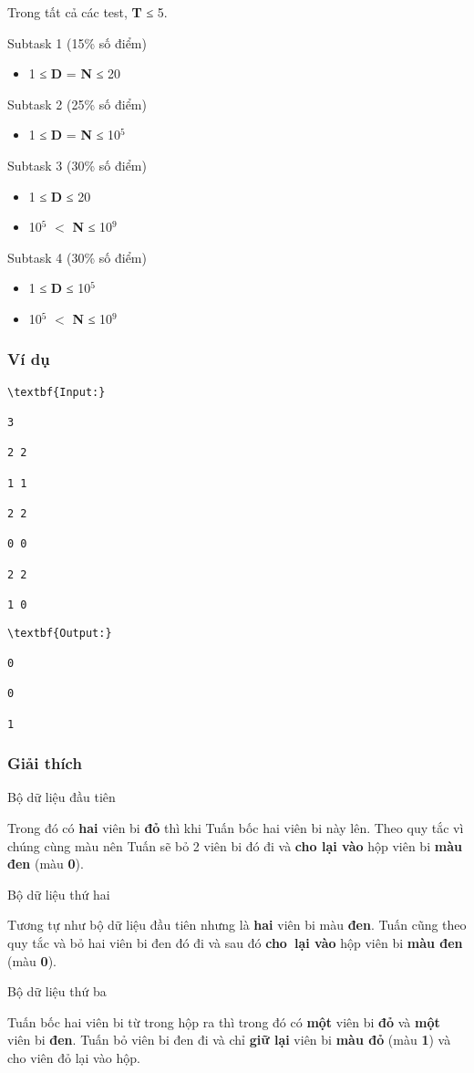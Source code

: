 Trong tất cả các test, \textbf{T} ≤ 5.

Subtask 1 (15\% số điểm)
\begin{itemize}
	\item 1 ≤ \textbf{D} = \textbf{N} ≤ 20
\end{itemize}

Subtask 2 (25\% số điểm)
\begin{itemize}
	\item 1 ≤ \textbf{D} = \textbf{N} ≤ 10$^5$
\end{itemize}

Subtask 3 (30\% số điểm)
\begin{itemize}
	\item 1 ≤ \textbf{D} ≤ 20
	\item 10$^5$ $<$ \textbf{N} ≤ 10$^9$
\end{itemize}

Subtask 4 (30\% số điểm)
\begin{itemize}
	\item 1 ≤ \textbf{D} ≤ 10$^5$
	\item 10$^5$ $<$ \textbf{N} ≤ 10$^9$
\end{itemize}

\subsubsection{Ví dụ}
\begin{verbatim}
\textbf{Input:}

3

2 2

1 1

2 2

0 0

2 2

1 0\end{verbatim}
\begin{verbatim}
\textbf{Output:}

0

0

1\end{verbatim}

\subsubsection{Giải thích}

Bộ dữ liệu đầu tiên

Trong đó có \textbf{hai} viên bi \textbf{đỏ} thì khi Tuấn bốc hai viên bi này lên. Theo quy tắc vì chúng cùng màu nên Tuấn sẽ bỏ 2 viên bi đó đi và \textbf{cho lại vào} hộp viên bi \textbf{màu đen} (màu \textbf{0}).

Bộ dữ liệu thứ hai

Tương tự như bộ dữ liệu đầu tiên nhưng là \textbf{hai} viên bi màu \textbf{đen}. Tuấn cũng theo quy tắc và bỏ hai viên bi đen đó đi và sau đó \textbf{cho lại vào} hộp viên bi \textbf{màu đen} (màu \textbf{0}).

Bộ dữ liệu thứ ba

Tuấn bốc hai viên bi từ trong hộp ra thì trong đó có \textbf{một} viên bi \textbf{đỏ} và \textbf{một} viên bi \textbf{đen}. Tuấn bỏ viên bi đen đi và chỉ \textbf{giữ lại} viên bi \textbf{màu đỏ} (màu \textbf{1}) và cho viên đỏ lại vào hộp.